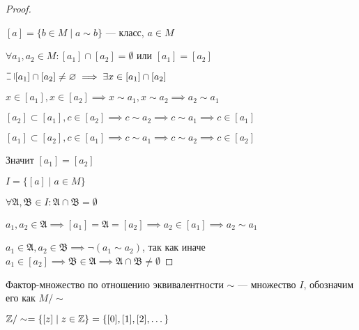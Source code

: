 \begin{proof}~
    
    $[a] = \{b \in M \mid a \sim b\}$ --- класс, $a \in M$
    
    $\forall a_1, a_2 \in M : [a_1] \cap [a_2] = \emptyset$ или $[a_1] = [a_2]$
    
    $\letus [a_1] \cap [a_2] \neq \emptyset \implies \exists x \in [a_1] \cap [a_2]$
    
    $x \in [a_1], x \in [a_2] \implies x \sim a_1, x \sim a_2 \implies a_2 \sim a_1$
    
    $[a_2] \subset [a_1], c \in [a_2] \implies c \sim a_2 \implies c \sim a_1 \implies c \in [a_1]$
    
    $[a_1] \subset [a_2], c \in [a_1] \implies c \sim a_1 \implies c \sim a_2 \implies c \in [a_2]$
    
    Значит $[a_1] = [a_2]$
    
    $I = \{[a] \mid a \in M\}$
    
    $\forall \mathfrak{A}, \mathfrak{B} \in I: \mathfrak{A} \cap \mathfrak{B} = \emptyset$
    
    $a_1, a_2 \in \mathfrak{A} \implies [a_1] = \mathfrak{A} = [a_2] \implies a_2 \in [a_1] \implies a_2 \sim a_1$\
    
    $a_1 \in \mathfrak{A}, a_2 \in \mathfrak{B} \implies \neg(a_1 \sim a_2)$, так как иначе $a_1 \in [a_2] \implies \mathfrak{B} \in \mathfrak{A} \implies \mathfrak{A} \cap \mathfrak{B} \neq \emptyset$
\end{proof}

\begin{defn}
    Фактор-множество по отношению эквивалентности $\sim$ --- множество $I$, обозначим его как $M/\sim$
\end{defn}

\begin{example}
    $\mathbb{Z}/\sim = \{[z] \mid z \in \mathbb{Z} \} = \{[0], [1], [2], \dots\}$
\end{example}